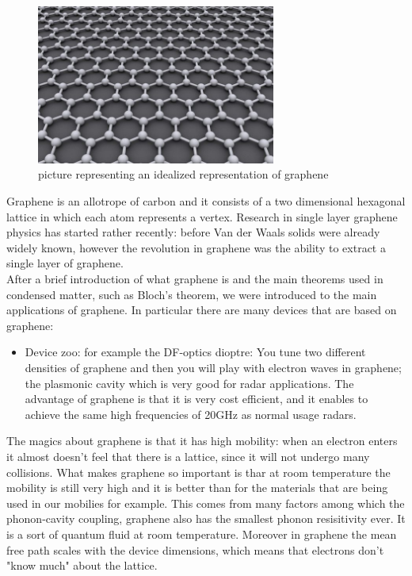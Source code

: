 \documentclass[12pt,a4paper]{article}
\begin{document}
\begin{figure}[h]
\caption{picture representing an idealized representation of graphene}
\centering
\includegraphics[width=0.7\textwidth]{graphene}
\end{figure}
Graphene is an allotrope of carbon and it consists of a two dimensional hexagonal lattice in which each atom represents a vertex.
Research in single layer graphene physics has started rather recently: before Van der Waals solids were already widely known, however the revolution in graphene was the ability to extract a single layer of graphene. \\
After a brief introduction of what graphene is and the main theorems used in condensed matter, such as Bloch's theorem, we were introduced to the main applications of graphene. In particular there are many devices that are based on graphene:
\begin{itemize}
\item Device zoo: for example the DF-optics dioptre: You tune two different densities of graphene and then you will play with electron waves in graphene;
the plasmonic cavity which is very good for radar applications. The advantage of graphene is that it is very cost efficient, and it enables to achieve the same high frequencies of 20GHz as normal usage radars.
\end{itemize}
The magics about graphene is that it has high mobility: when an electron enters it almost doesn't feel that there is a lattice, since it will not undergo many collisions. What makes graphene so important is thar at room temperature the mobility is still very high and it is better than for the materials that are being used in our mobilies for example. This comes from many factors among which the phonon-cavity coupling, graphene also has the smallest phonon resisitivity ever. It is a sort of quantum fluid at room temperature. Moreover in graphene the mean free path scales with the device dimensions, which means that electrons don't "know much" about the lattice.
\end{document}
